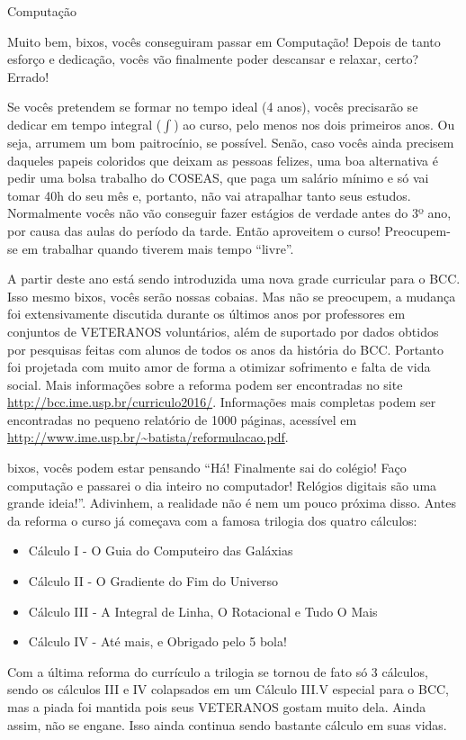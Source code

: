 \begin{subsecao}{Computação}

Muito bem, bixos, vocês conseguiram passar em Computação! Depois de tanto esforço
e dedicação, vocês vão finalmente poder descansar e relaxar, certo? Errado!

Se vocês pretendem se formar no tempo ideal (4 anos), vocês precisarão se
dedicar em tempo integral ($\int$) ao curso, pelo menos nos dois primeiros
anos. Ou seja, arrumem um bom paitrocínio, se possível. Senão, caso vocês ainda
precisem daqueles papeis coloridos que deixam as pessoas felizes, uma boa
alternativa é pedir uma bolsa trabalho do COSEAS, que paga um salário mínimo e
só vai tomar 40h do seu mês e, portanto, não vai atrapalhar tanto seus estudos.
Normalmente vocês não vão conseguir fazer estágios de verdade antes do 3º ano,
por causa das aulas do período da tarde. Então aproveitem o curso!  Preocupem-se
em trabalhar quando tiverem mais tempo ``livre''.

A partir deste ano está sendo introduzida uma nova grade curricular para o
BCC. Isso mesmo bixos, vocês serão nossas cobaias. Mas não se preocupem, a
mudança foi extensivamente discutida durante os últimos anos por professores em
conjuntos de VETERANOS voluntários, além de suportado por dados obtidos por
pesquisas feitas com alunos de todos os anos da história do BCC. Portanto foi
projetada com muito amor de forma a otimizar sofrimento e falta de vida
social. Mais informações sobre a reforma podem ser encontradas no site
\url{http://bcc.ime.usp.br/curriculo2016/}. Informações mais completas podem ser
encontradas no pequeno relatório de 1000 páginas, acessível em
\url{http://www.ime.usp.br/~batista/reformulacao.pdf}.

bixos, vocês podem estar pensando ``Há! Finalmente sai do colégio! Faço
computação e passarei o dia inteiro no computador! Relógios digitais são uma
grande ideia!''. Adivinhem, a realidade não é nem um pouco próxima disso. Antes
da reforma o curso já começava com a famosa trilogia dos quatro cálculos:
\begin{itemize}
\item Cálculo I - O Guia do Computeiro das Galáxias
\item Cálculo II - O Gradiente do Fim do Universo
\item Cálculo III - A Integral de Linha, O Rotacional e Tudo O Mais
\item Cálculo IV - Até mais, e Obrigado pelo 5 bola!
\end{itemize}
Com a última reforma do currículo a trilogia se tornou de fato só 3 cálculos,
sendo os cálculos III e IV colapsados em um Cálculo III.V especial para o BCC,
mas a piada foi mantida pois seus VETERANOS gostam muito dela. Ainda assim, não
se engane. Isso ainda continua sendo bastante cálculo em suas vidas.


\end{subsecao}
